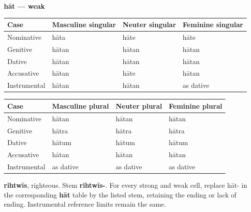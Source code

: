 \textbf{hāt — weak}

\par\begingroup
\fontsize{10.5}{13.2}\selectfont
\setlength{\LTleft}{0pt}\setlength{\LTright}{\fill}
\noindent
\begin{tabular}{@{}>{\raggedright\arraybackslash}p{22.0mm}>{\raggedright\arraybackslash}p{31.188mm}>{\raggedright\arraybackslash}p{31.188mm}>{\raggedright\arraybackslash}p{31.188mm}@{}}
\toprule
\textbf{Case} & \textbf{Masculine singular} & \textbf{Neuter singular} & \textbf{Feminine singular} \\
\midrule
Nominative & hāta & hāte & hāte \\
Genitive & hātan & hātan & hātan \\
Dative & hātan & hātan & hātan \\
Accusative & hātan & hāte & hātan \\
Instrumental & hātan & hātan & as dative \\
\bottomrule
\end{tabular}
\par\endgroup
\par\addvspace{5pt}
\par\begingroup
\fontsize{10.5}{13.2}\selectfont
\setlength{\LTleft}{0pt}\setlength{\LTright}{\fill}
\noindent
\begin{tabular}{@{}>{\raggedright\arraybackslash}p{22.0mm}>{\raggedright\arraybackslash}p{31.188mm}>{\raggedright\arraybackslash}p{31.188mm}>{\raggedright\arraybackslash}p{31.188mm}@{}}
\toprule
\textbf{Case} & \textbf{Masculine plural} & \textbf{Neuter plural} & \textbf{Feminine plural} \\
\midrule
Nominative & hātan & hātan & hātan \\
Genitive & hātra & hātra & hātra \\
Dative & hātum & hātum & hātum \\
Accusative & hātan & hātan & hātan \\
Instrumental & as dative & as dative & as dative \\
\bottomrule
\end{tabular}
\par\endgroup

\textbf{rihtwīs}, righteous. Stem \textbf{rihtwīs-}. For every strong and weak cell, replace hāt- in the corresponding \textbf{hāt} table by the listed stem, retaining the ending or lack of ending. Instrumental reference limits remain the same.

